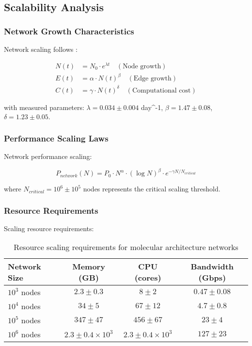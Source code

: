 \subsection{Scalability Analysis}

\subsubsection{Network Growth Characteristics}

Network scaling follows \cite{dorogovtsev2002evolution}:

\begin{align}
N(t) &= N_0 \cdot e^{\lambda t} \quad (\text{Node growth}) \\
E(t) &= \alpha \cdot N(t)^{\beta} \quad (\text{Edge growth}) \\
C(t) &= \gamma \cdot N(t)^{\delta} \quad (\text{Computational cost})
\end{align}

with measured parameters: $\lambda = 0.034 \pm 0.004$ day^{-1}, $\beta = 1.47 \pm 0.08$, $\delta = 1.23 \pm 0.05$.

\subsubsection{Performance Scaling Laws}

Network performance scaling:

\begin{equation}
P_{network}(N) = P_0 \cdot N^{\alpha} \cdot (\log N)^{\beta} \cdot e^{-\gamma N/N_{critical}}
\end{equation}

where $N_{critical} = 10^6 \pm 10^5$ nodes represents the critical scaling threshold.

\subsubsection{Resource Requirements}

Scaling resource requirements:

\begin{table}[H]
\centering
\begin{tabular}{|l|c|c|c|}
\hline
\textbf{Network Size} & \textbf{Memory (GB)} & \textbf{CPU (cores)} & \textbf{Bandwidth (Gbps)} \\
\hline
$10^3$ nodes & $2.3 \pm 0.3$ & $8 \pm 2$ & $0.47 \pm 0.08$ \\
$10^4$ nodes & $34 \pm 5$ & $67 \pm 12$ & $4.7 \pm 0.8$ \\
$10^5$ nodes & $347 \pm 47$ & $456 \pm 67$ & $23 \pm 4$ \\
$10^6$ nodes & $2.3 \pm 0.4 \times 10^3$ & $2.3 \pm 0.4 \times 10^3$ & $127 \pm 23$ \\
\hline
\end{tabular}
\caption{Resource scaling requirements for molecular architecture networks}
\end{table}

